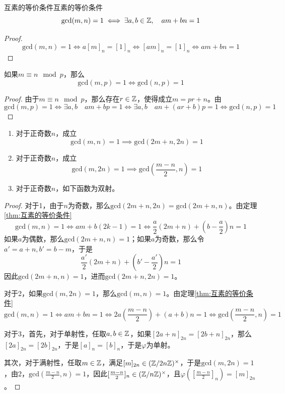 \begin{theorem}{互素的等价条件}{互素的等价条件}
	$$
	\mathrm{gcd}(m,n)=1\iff \exists a,b\in\mathbb{Z},\quad am+bn=1
	$$
\end{theorem}

\begin{proof}
	$$
	\mathrm{gcd}(m,n)=1\iff a[m]_n=[1]_n\iff[am]_n=[1]_n\iff am+bn=1
	$$
\end{proof}

\begin{proposition}
	如果$m\equiv n\mod p$，那么
	$$
	\mathrm{gcd}(m,p)=1\iff \mathrm{gcd}(n,p)=1
	$$
\end{proposition}

\begin{proof}
	由于$m\equiv n\mod p$，那么存在$r\in\mathbb{Z}$，使得成立$m=pr+n$。由
	$$
	\mathrm{gcd}(m,p)=1
	\iff \exists a,b \quad am+bp=1
	\iff \exists a,b \quad an+(ar+b)p=1
	\iff\mathrm{gcd}(n,p)=1
	$$
\end{proof}

\begin{proposition}
	\begin{enumerate}
		\item 对于正奇数$n$，成立
		$$
		\mathrm{gcd}(m,n)=1\implies\mathrm{gcd}(2m+n,2n)=1
		$$
		\item 对于正奇数$n$，成立
		$$
		\mathrm{gcd}(m,2n)=1\implies\mathrm{gcd}(\frac{m-n}{2},n)=1
		$$
		\item 对于正奇数$n$，如下函数为双射。
	\end{enumerate}
\end{proposition}

\begin{proof}
	对于1，由于$n$为奇数，那么$\mathrm{gcd}(2m+n,2n)=\mathrm{gcd}(2m+n,n)$。由定理\ref{thm:互素的等价条件}
	$$
	\mathrm{gcd}(m,n)=1
	\iff am+b(2k-1)=1
	\iff \frac{a}{2}(2m+n)+(b-\frac{a}{2})n=1
	$$
	如果$a$为偶数，那么$\mathrm{gcd}(2m+n,n)=1$；如果$a$为奇数，那么令$a'=a+n,b'=b-m$，于是
	$$
	\frac{a'}{2}(2m+n)+(b'-\frac{a'}{2})n=1
	$$
	因此$\mathrm{gcd}(2m+n,n)=1$，进而$\mathrm{gcd}(2m+n,2n)=1$。
	
	对于2，如果$\mathrm{gcd}(m,2n)=1$，那么$\mathrm{gcd}(m,n)=1$。由定理\ref{thm:互素的等价条件}
	$$
	\mathrm{gcd}(m,n)=1\iff
	am+bn=1\iff
	2a(\frac{m-n}{2})+(a+b)n=1\iff
	\mathrm{gcd}(\frac{m-n}{2},n)=1
	$$
	
	对于3，首先，对于单射性，任取$a,b\in\mathbb{Z}$，如果$[2a+n]_{2n}=[2b+n]_{2n}$，那么$[2a]_{2n}=[2b]_{2n}$，于是$[a]_n=[b]_n$，于是$\varphi$为单射。
	
	其次，对于满射性，任取$m\in\mathbb{Z}$，满足$[m]_{2n}\in(\mathbb{Z}/2n\mathbb{Z})^{\times}$，于是$\mathrm{gcd}(m,2n)=1$，由2，$\mathrm{gcd}(\frac{m-n}{2},n)=1$，因此$[\frac{m-n}{2}]_{n}\in(\mathbb{Z}/n\mathbb{Z})^{\times}$，且$\varphi([\frac{m-n}{2}]_{n})=[m]_{2n}$。
\end{proof}

